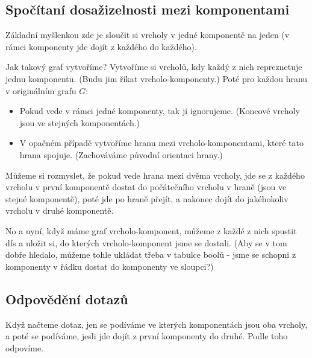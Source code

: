 \documentclass{article}
\begin{document}
\subsection{Spočítaní dosažizelnosti mezi komponentami}
Základní myšlenkou zde je sloučit si vrcholy v jedné komponentě na jeden (v rámci komponenty jde dojít z každého do každého).

Jak takový graf vytvoříme? Vytvoříme si vrcholů, kdy každý z nich repreznetuje jednu komponentu. (Budu jim říkat vrcholo-komponenty.) Poté pro každou hranu v originálním grafu \(G\):
\begin{itemize}
    \item Pokud vede v rámci jedné komponenty, tak ji ignorujeme. (Koncové vrcholy jsou ve stejných komponentách.)
    \item V opačném případě vytvoříme hranu mezi vrcholo-komponentami, které tato hrana spojuje. (Zachováváme původní orientaci hrany.)
\end{itemize}
Můžeme si rozmyslet, že pokud vede hrana mezi dvěma vrcholy, jde se z každého vrcholu v první komponentě dostat do počátečního vrcholu v hraně
(jsou ve stejné komponentě), poté jde po hraně přejít, a nakonec dojít do jakéhokoliv vrcholu v druhé komponentě.

No a nyní, když máme graf vrcholo-komponent, můžeme z každé z nich spustit dfs a uložit si, do kterých vrcholo-komponent jsme se dostali.
(Aby se v tom dobře hledalo, můžeme tohle ukládat třeba v tabulce boolů - jsme se schopni z komponenty v řádku dostat do komponenty ve sloupci?)

\subsection{Odpovědění dotazů}
Když načteme dotaz, jen se podíváme ve kterých komponentách jsou oba vrcholy, a poté se podíváme, jesli jde dojít z první komponenty do druhé.
Podle toho odpovíme.
\end{document}
